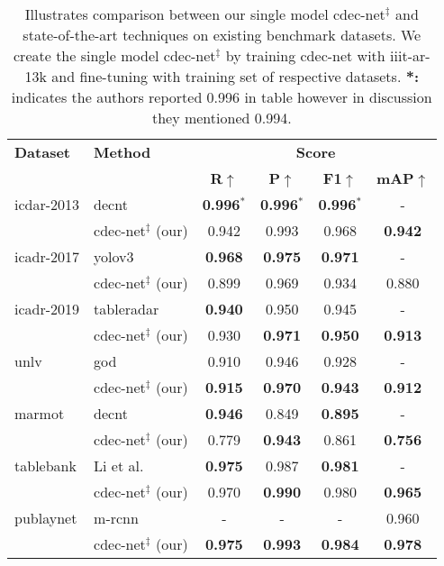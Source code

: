 \documentclass[a4paper,conference]{IEEEtran}
\begin{document}
\begin{table}[ht!]
\addtolength{\tabcolsep}{-2.0pt}
\begin{center}
\begin{tabular}{|l|l|c c c c|} \hline
\textbf{Dataset} &\textbf{Method} &\multicolumn{4}{|c|}{\textbf{Score}} \\ \cline{3-6}
 &  &\textbf{R}$\uparrow$ &\textbf{P}$\uparrow$ &\textbf{F1}$\uparrow$ &\textbf{mAP}$\uparrow$ \\ \hline 
{\sc icdar-2013} &{\sc d}e{\sc cnt}~\cite{siddiqui2018decnt} &\textbf{0.996}$^{*}$ &\textbf{0.996}$^{*}$ &\textbf{0.996}$^{*}$ &- \\
 &{\sc cd}e{\sc c-n}et$^{\ddagger}$ (our) &0.942 &0.993 &0.968 &\textbf{0.942} \\ \hline
{\sc icadr-2017} &{\sc yolo}v3~\cite{huang2019yolo} &\textbf{0.968} &\textbf{0.975} &\textbf{0.971} &- \\
&{\sc cd}e{\sc c-n}et$^{\ddagger}$ (our) &0.899	&0.969 &0.934 &0.880 \\  \hline
{\sc icadr-2019} &{\sc t}able{\sc r}adar~\cite{gao2019icdar} &\textbf{0.940} &0.950 &0.945 &- \\
 &{\sc cd}e{\sc c-n}et$^{\ddagger}$ (our) &0.930 &\textbf{0.971} &\textbf{0.950} &\textbf{0.913} \\ \hline 
 {\sc unlv} &{\sc god}~\cite{saha2019graphical} &0.910 &0.946 &0.928 &- \\ 
  &{\sc cd}e{\sc c-n}et$^{\ddagger}$ (our) &\textbf{0.915} &\textbf{0.970} &\textbf{0.943} &\textbf{0.912} \\ \hline
{\sc m}armot &{\sc d}e{\sc cnt}~\cite{siddiqui2018decnt} &\textbf{0.946} &0.849 &\textbf{0.895} &- \\ 
&{\sc cd}e{\sc c-n}et$^{\ddagger}$ (our) &0.779 &\textbf{0.943} &0.861 &\textbf{0.756} \\ \hline
{\sc t}able{\sc b}ank &Li et al.~\cite{li2019tablebank} &\textbf{0.975} &0.987 &\textbf{0.981} &- \\
 &{\sc cd}e{\sc c-n}et$^{\ddagger}$ (our) &0.970 &\textbf{0.990} &0.980 &\textbf{0.965} \\ \hline
{\sc p}ub{\sc l}ay{\sc n}et &{\sc m-rcnn}~\cite{zhong2019publaynet} &- & -&- &0.960 \\ 
 &{\sc cd}e{\sc c-n}et$^{\ddagger}$ (our) & \textbf{0.975} & \textbf{0.993} & \textbf{0.984} & \textbf{0.978}  \\ \hline
 \end{tabular}
\end{center}
\caption{Illustrates comparison between our single model {\sc cd}e{\sc c-n}et$^{\ddagger}$ and state-of-the-art techniques on existing benchmark datasets. We create the single model {\sc cd}e{\sc c-n}et$^{\ddagger}$ by training {\sc cd}e{\sc c-n}et with {\sc iiit-ar-13k} and fine-tuning with training set of respective datasets. \textbf{*:} indicates the authors reported 0.996 in table however in discussion they mentioned 0.994. \label{single_comparion_table}}
\end{table}
 
\end{document}
